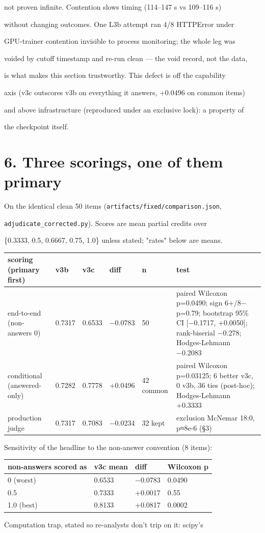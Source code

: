 \documentclass[11pt,a4paper]{article}
\begin{document}
not proven infinite. Contention slows timing (114–147 s vs 109–116 s)

without changing outcomes. One L3b attempt ran 4/8 HTTPError under

GPU-trainer contention invisible to process monitoring; the whole leg was

voided by cutoff timestamp and re-run clean — the void record, not the data,

is what makes this section trustworthy. This defect is off the capability

axis (v3c outscores v3b on everything it answers, +0.0496 on common items)

and above infrastructure (reproduced under an exclusive lock): a property of

the checkpoint itself.

\section*{6. Three scorings, one of them primary}
On the identical clean 50 items (\texttt{artifacts/fixed/comparison.json},

\texttt{adjudicate\_corrected.py}). Scores are mean partial credits over

\{0.3333, 0.5, 0.6667, 0.75, 1.0\} unless stated; "rates" below are means.

\begin{center}\small\begin{tabular}{p{2.6cm}|p{2.6cm}|p{2.6cm}|p{2.6cm}|p{2.6cm}|p{2.6cm}}
\hline
scoring (primary first) & v3b & v3c & diff & n & test \\ \hline
end-to-end (non-answers 0) & 0.7317 & 0.6533 & −0.0783 & 50 & paired Wilcoxon p=0.0490; sign 6+/8− p=0.79; bootstrap 95\% CI [−0.1717, +0.0050]; rank-biserial −0.278; Hodges-Lehmann −0.2083 \\ \hline
conditional (answered-only) & 0.7282 & 0.7778 & +0.0496 & 42 common & paired Wilcoxon p=0.03125; 6 better v3c, 0 v3b, 36 ties (post-hoc); Hodges-Lehmann +0.3333 \\ \hline
production judge & 0.7317 & 0.7083 & −0.0234 & 32 kept & exclusion McNemar 18:0, p≈8e-6 (§3) \\ \hline
\end{tabular}\end{center}
Sensitivity of the headline to the non-answer convention (8 items):

\begin{center}\small\begin{tabular}{p{3.9cm}|p{3.9cm}|p{3.9cm}|p{3.9cm}}
\hline
non-answers scored as & v3c mean & diff & Wilcoxon p \\ \hline
0 (worst) & 0.6533 & −0.0783 & 0.0490 \\ \hline
0.5 & 0.7333 & +0.0017 & 0.55 \\ \hline
1.0 (best) & 0.8133 & +0.0817 & 0.0002 \\ \hline
\end{tabular}\end{center}
Computation trap, stated so re-analysts don't trip on it: scipy's
\end{document}
